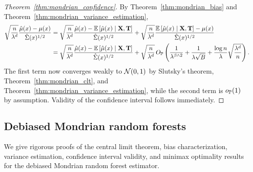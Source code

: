 \begin{proof}[Theorem~\ref{thm:mondrian_confidence}]
  By Theorem~\ref{thm:mondrian_bias}
  and Theorem~\ref{thm:mondrian_variance_estimation},
  \begin{align*}
    \sqrt{\frac{n}{\lambda^d}}
    \frac{\hat \mu(x) - \mu(x)}{\hat \Sigma(x)^{1/2}}
    &=
    \sqrt{\frac{n}{\lambda^d}}
    \frac{\hat \mu(x) - \E \left[ \hat \mu(x) \mid \bX, \bT \right]}
    {\hat \Sigma(x)^{1/2}}
    + \sqrt{\frac{n}{\lambda^d}}
    \frac{\E \left[ \hat \mu(x) \mid \bX, \bT \right] - \mu(x)}
    {\hat \Sigma(x)^{1/2}} \\
    &=
    \sqrt{\frac{n}{\lambda^d}}
    \frac{\hat \mu(x) - \E \left[ \hat \mu(x) \mid \bX, \bT \right]}
    {\hat \Sigma(x)^{1/2}}
    + \sqrt{\frac{n}{\lambda^d}} \,
    O_\P \left(
      \frac{1}{\lambda^{\beta \wedge 2}}
      + \frac{1}{\lambda \sqrt B}
      + \frac{\log n}{\lambda} \sqrt{\frac{\lambda^d}{n}}
    \right).
  \end{align*}
  The first term now converges weakly to $\cN(0,1)$ by
  Slutsky's theorem, Theorem~\ref{thm:mondrian_clt},
  and Theorem~\ref{thm:mondrian_variance_estimation},
  while the second term is $o_\P(1)$ by assumption.
  Validity of the confidence interval follows immediately.
\end{proof}

\subsection{Debiased Mondrian random forests}

We give rigorous proofs of the central limit theorem,
bias characterization, variance estimation,
confidence interval validity, and minimax optimality
results for the debiased Mondrian random forest estimator.

